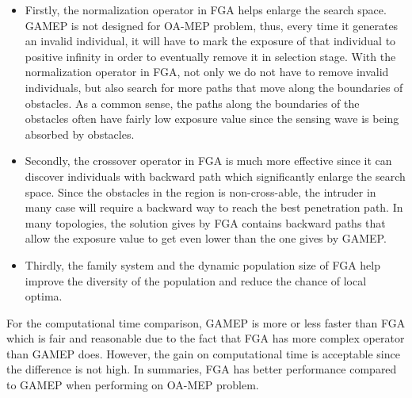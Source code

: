 \documentclass[final]{elsarticle}
\begin{document}
\begin{itemize}
	\item Firstly, the normalization operator in FGA helps enlarge the search space. GAMEP is not designed for OA-MEP problem, thus, every time it generates an invalid individual, it will have to mark the exposure of that individual to positive infinity in order to eventually remove it in selection stage. With the normalization operator in FGA, not only we do not have to remove invalid individuals, but also search for more paths that move along the boundaries of obstacles. As a common sense, the paths along the boundaries of the obstacles often have fairly low exposure value since the sensing wave is being absorbed by obstacles. 
	\item Secondly, the crossover operator in FGA is much more effective since it can discover individuals with backward path which significantly enlarge the search space. Since the obstacles in the region is non-cross-able, the intruder in many case will require a backward way to reach the best penetration path. In many topologies, the solution gives by FGA contains backward paths that allow the exposure value to get even lower than the one gives by GAMEP. 
	\item Thirdly, the family system and the dynamic population size of FGA help improve the diversity of the population and reduce the chance of local optima. 
\end{itemize}
For the computational time comparison, GAMEP is more or less faster than FGA which is fair and reasonable due to the fact that FGA has more complex operator than GAMEP does. However, the gain on computational time is acceptable since the difference is not high. In summaries, FGA has better performance compared to GAMEP when performing on OA-MEP problem. 
\end{document}
